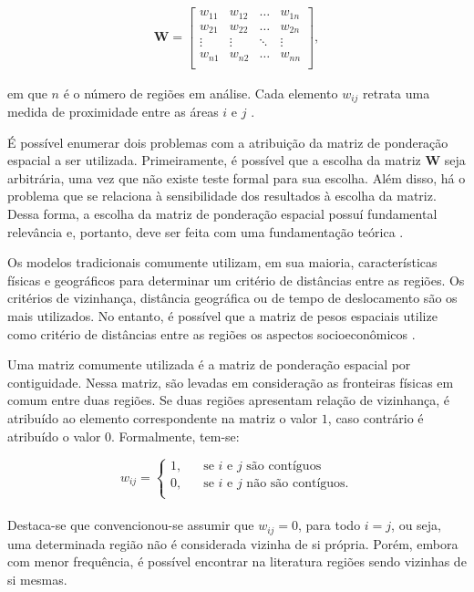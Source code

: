 \documentclass[
	12pt,				%
	openright,			%
	oneside,			%
	a4paper,			%
	chapter=TITLE,		%
	section=TITLE,		%
	english,			%
	french,				%
	spanish,			%
	brazil				%
	]{abntex2}
\begin{document}
\begin{align*}
	\boldsymbol{W} =
	\left[
	\begin{array}{cccc}
		w_{11} & w_{12} & \dots & w_{1n} \\
		w_{21} & w_{22} & \dots &w_{2n} \\
		\vdots & \vdots & \ddots & \vdots \\
		w_{n1} & w_{n2} & \dots & w_{nn}\\
	\end{array}
	\right],
\end{align*}

\noindent em que $n$ é o número de regiões em análise. Cada elemento $w_{ij}$ retrata uma medida de proximidade entre as áreas $i$ e $j$ \cite{camara04}. 

É possível enumerar dois problemas com a atribuição da matriz de ponderação espacial a ser utilizada. Primeiramente, é possível que a escolha da matriz $\boldsymbol{W}$ seja arbitrária, uma vez que não existe teste formal para sua escolha. Além disso, há o problema que se relaciona à sensibilidade dos resultados à escolha da matriz. Dessa forma, a escolha da matriz de ponderação espacial possuí fundamental relevância e, portanto, deve ser feita com uma fundamentação teórica \cite{almeida12}. 

Os modelos tradicionais comumente utilizam, em sua maioria, características físicas e geográficos para determinar um critério de distâncias entre as regiões. Os critérios de vizinhança, distância geográfica ou de tempo de deslocamento são os mais utilizados. No entanto, é possível que a matriz de pesos espaciais utilize como critério de distâncias entre as regiões os aspectos socioeconômicos \cite{tyszler06}. 

Uma matriz comumente utilizada é a matriz de ponderação espacial por contiguidade. Nessa matriz, são levadas em consideração as fronteiras físicas em comum entre duas regiões. Se duas regiões apresentam relação de vizinhança, é atribuído ao elemento correspondente na matriz o valor $1$, caso contrário é atribuído o valor $0$. Formalmente, tem-se:

\[
w_{ij} = 
\begin{cases}
\text{1,} & \quad\text{se $i$ e $j$ são contíguos} \\
\text{0,} & \quad\text{se $i$ e $j$ não são contíguos.}\\
\end{cases}
\]
\\

Destaca-se que convencionou-se assumir que $w_{ij} =  0$, para todo $i = j$, ou seja, uma determinada região não é considerada vizinha de si própria. Porém, embora com menor frequência, é possível encontrar na literatura regiões sendo vizinhas de si mesmas. %
\end{document}
